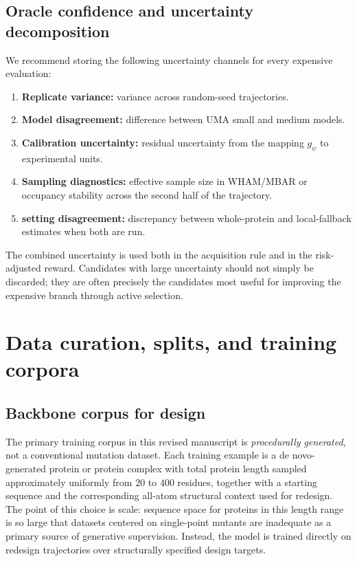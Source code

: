 \documentclass[11pt]{article}
\begin{document}
\subsection{Oracle confidence and uncertainty decomposition}

We recommend storing the following uncertainty channels for every expensive evaluation:
\begin{enumerate}[leftmargin=1.5em]
    \item \textbf{Replicate variance:} variance across random-seed trajectories.
    \item \textbf{Model disagreement:} difference between UMA small and medium models.
    \item \textbf{Calibration uncertainty:} residual uncertainty from the mapping $g_\psi$ to experimental units.
    \item \textbf{Sampling diagnostics:} effective sample size in WHAM/MBAR or occupancy stability across the second half of the trajectory.
    \item \textbf{setting disagreement:} discrepancy between whole-protein and local-fallback estimates when both are run.
\end{enumerate}
The combined uncertainty is used both in the acquisition rule and in the risk-adjusted reward. Candidates with large uncertainty should not simply be discarded; they are often precisely the candidates most useful for improving the expensive branch through active selection.


\section{Data curation, splits, and training corpora}
\label{sec:data}


\subsection{Backbone corpus for design}

The primary training corpus in this revised manuscript is \emph{procedurally generated}, not a conventional mutation dataset. Each training example is a de novo-generated protein or protein complex with total protein length sampled approximately uniformly from $20$ to $400$ residues, together with a starting sequence and the corresponding all-atom structural context used for redesign. The point of this choice is scale: sequence space for proteins in this length range is so large that datasets centered on single-point mutants are inadequate as a primary source of generative supervision. Instead, the model is trained directly on redesign trajectories over structurally specified design targets.
\end{document}

